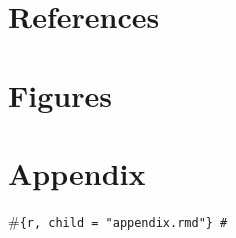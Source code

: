 \documentclass[
  12pt,
]{article}
\newlength{\cslhangindent}
\newlength{\cslentryspacingunit} %
\newenvironment{CSLReferences}[2] %
 {%
  \setlength{\parindent}{0pt}
  \ifodd #1
  \let\oldpar\par
  \def\par{\hangindent=\cslhangindent\oldpar}
  \fi
  \setlength{\parskip}{#2\cslentryspacingunit}
 }%
 {}
\begin{document}
\hypertarget{references}{%
\section{References}\label{references}}

\hypertarget{refs}{}
\begin{CSLReferences}{0}{0}
\end{CSLReferences}

\newpage

\hypertarget{figures}{%
\section*{Figures}\label{figures}}

\hypertarget{appendix}{%
\section*{Appendix}\label{appendix}}

\#\texttt{\{r,\ child\ =\ "appendix.rmd"\}\ \#}
\end{document}
